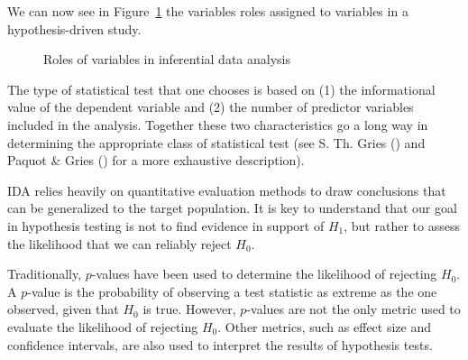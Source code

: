 \documentclass[
  letterpaper,
]{latex/krantz}
\theoremstyle{definition}
\theoremstyle{remark}
\begin{document}
We can now see in Figure~\ref{fig-analysis-ida-variables} the variables
roles assigned to variables in a hypothesis-driven study.

\begin{figure}[!htb]


\caption{\label{fig-analysis-ida-variables}Roles of variables in
inferential data analysis}

\end{figure}%

The type of statistical test that one chooses is based on (1) the
informational value of the dependent variable and (2) the number of
predictor variables included in the analysis. Together these two
characteristics go a long way in determining the appropriate class of
statistical test (see S. Th. Gries () and
Paquot \& Gries () for a more exhaustive
description).

IDA relies heavily on quantitative evaluation methods to draw
conclusions that can be generalized to the target population. It is key
to understand that our goal in hypothesis testing is not to find
evidence in support of \(H_1\), but rather to assess the likelihood that
we can reliably reject \(H_0\).

Traditionally, \(p\)-values have been used to determine the likelihood
of rejecting \(H_0\). A \(p\)-value is the probability of observing a
test statistic as extreme as the one observed, given that \(H_0\) is
true. However, \(p\)-values are not the only metric used to evaluate the
likelihood of rejecting \(H_0\). Other metrics, such as effect size and
confidence intervals, are also used to interpret the results of
hypothesis tests.
\end{document}
